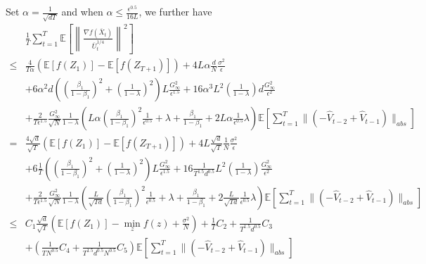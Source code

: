 \documentclass{article} %
\begin{document}
Set $\alpha = \frac{1}{\sqrt{dT}}$ and when $\alpha  \leq \frac{\epsilon^{0.5}}{16L} $, we further have
\begin{align}
& \frac{1}{T}\sum_{t=1}^T  \mathbb E \left [\left\|\frac{\nabla f( \overline X_{t})}{\overline U_{t}^{1/4}}\right\|^2  \right] \nonumber \\
\leq & \frac{4}{T\alpha} ( \mathbb E  [f( Z_{1})]  -  \mathbb E [f( Z_{T+1})]) +  {4L}\alpha  \frac{d}{N}
\frac{ \sigma^2 }{\epsilon}  \nonumber \\
&+  6\alpha^2 d \left(\left( \frac{\beta_1}{1-\beta_1}\right)^2 + \left (\frac{1}{1-\lambda} \right)^2 \right)L  \frac{G_{\infty}^2 }{\epsilon^{1.5}} +  {16}\alpha^3 L^2     \left( \frac{1}{1-\lambda}\right)d \frac{G_{\infty}^2}{\epsilon^2} \nonumber \\
& +   \frac{2}{T \epsilon^{1.5}}  \frac{G_{\infty}^2}{\sqrt{N}} \frac{1}{1-\lambda}  \left( L  \alpha \left ( \frac{\beta_1}{1-\beta_1} \right)^2     \frac{1}{{\epsilon^{0.5}}}  +   \lambda + \frac{\beta_1}{1-\beta_1} + 2L\alpha \frac{1}{\epsilon^{0.5}}\lambda   \right)   \mathbb E \left[ \sum_{t=1}^{T}   \|    (- \hat V_{t-2} + \hat V_{t-1} ) \|_{abs} \right] \nonumber \\
= & \frac{4\sqrt{d}}{\sqrt{T}} ( \mathbb E  [f( Z_{1})]  -  \mathbb E [f( Z_{T+1})]) +  {4L}\frac{\sqrt{d}}{\sqrt{T}}  \frac{1}{N}
\frac{ \sigma^2 }{\epsilon}  \nonumber \\
&+  6
\frac{1}{T}  \left(\left( \frac{\beta_1}{1-\beta_1}\right)^2 + \left (\frac{1}{1-\lambda} \right)^2 \right)L  \frac{G_{\infty}^2 }{\epsilon^{1.5}} +  {16}\frac{1}{T^{1.5}d^{0.5}}L^2     \left( \frac{1}{1-\lambda}\right) \frac{G_{\infty}^2}{\epsilon^2} \nonumber \\
& +   \frac{2}{T \epsilon^{1.5}}  \frac{G_{\infty}^2}{\sqrt{N}} \frac{1}{1-\lambda}  \left( \frac{L}{\sqrt{Td}}  \left ( \frac{\beta_1}{1-\beta_1} \right)^2     \frac{1}{{\epsilon^{0.5}}}  +   \lambda + \frac{\beta_1}{1-\beta_1} + 2\frac{L}{\sqrt{Td}} \frac{1}{\epsilon^{0.5}}\lambda   \right)   \mathbb E \left[ \sum_{t=1}^{T}   \|    (- \hat V_{t-2} + \hat V_{t-1} ) \|_{abs} \right] \nonumber \\
\leq  & C_1 \frac{\sqrt{d}}{\sqrt{T}} \left(\mathbb E  [f( Z_{1})]  - \min_{z} f(z)  + \frac{\sigma^2}{N}\right)  +  \frac{ 1}{T} C_2    + \frac{1}{T^{1.5}d^{0.5}} C_3 \nonumber \\ 
&+ \left(  \frac{1}{T N^{0.5} } C_4 + \frac{1}{T^{1.5}d^{0.5} N^{0.5}} C_5  \right) \mathbb E \left[ \sum_{t=1}^{T}   \|    (- \hat V_{t-2} + \hat V_{t-1} ) \|_{abs} \right]  
\end{align}
\end{document}
